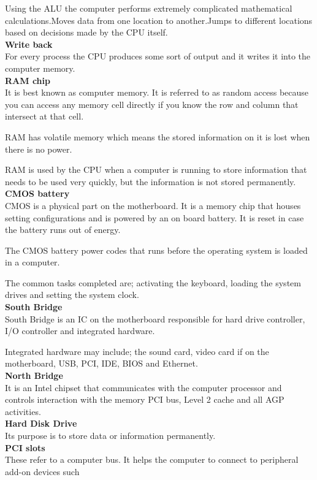 \documentclass{article}
\begin{document}
 Using the ALU the computer performs extremely complicated mathematical calculations.Moves data from one location to another.Jumps to different locations based on decisions made by the CPU itself.\\
\textbf{Write back}\\
For every process the CPU produces some sort of output and it writes it into the computer memory.\\
\textbf{RAM chip}\\
It is best known as computer memory. It is referred to as random access because you can access any memory cell directly if you know the row and column that intersect at that cell.
\par RAM has volatile memory which means the stored information on it is lost when there is no power.
\par RAM is used by the CPU when a computer is running to store information that needs to be used very quickly, but the information is not stored permanently.\\
\textbf{CMOS battery}\\
CMOS is a physical part on the motherboard. It is a memory chip that houses setting configurations and is powered by an on board battery. It is reset in case the battery runs out of energy.
\par The CMOS battery power codes that runs before the operating system is loaded in a computer.
\par The common tasks completed are; activating the keyboard, loading the system drives and setting the system clock.\\
\textbf{South Bridge}\\
South Bridge is an IC on the motherboard responsible for hard drive controller, I/O controller and integrated hardware.
\par Integrated hardware may include; the sound card, video card if on the motherboard, USB, PCI, IDE, BIOS and Ethernet.\\
\textbf{North Bridge}\\
It is an Intel chipset that communicates with the computer processor and controls interaction with the memory PCI bus, Level 2 cache and all AGP activities.\\
\textbf{Hard Disk Drive}\\
Its purpose is to store data or information permanently.\\
\textbf{PCI slots}\\
These refer to a computer bus. It helps the computer to connect to peripheral add-on devices such
\end{document}
